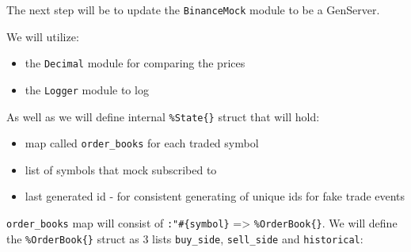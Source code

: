 \documentclass[
  oneside]{book}
\providecommand{\tightlist}{%
  \setlength{\itemsep}{0pt}\setlength{\parskip}{0pt}}
\begin{document}
The next step will be to update the \texttt{BinanceMock} module to be a GenServer.

We will utilize:

\begin{itemize}
\tightlist
\item
  the \texttt{Decimal} module for comparing the prices
\item
  the \texttt{Logger} module to log
\end{itemize}

\newpage

As well as we will define internal \texttt{\%State\{\}} struct that will hold:

\begin{itemize}
\tightlist
\item
  map called \texttt{order\_books} for each traded symbol
\item
  list of symbols that mock subscribed to
\item
  last generated id - for consistent generating of unique ids for fake trade events
\end{itemize}

\texttt{order\_books} map will consist of \texttt{:"\#\{symbol\}} =\textgreater{} \texttt{\%OrderBook\{\}}. We will define the \texttt{\%OrderBook\{\}} struct as 3 lists \texttt{buy\_side}, \texttt{sell\_side} and \texttt{historical}:
\end{document}
